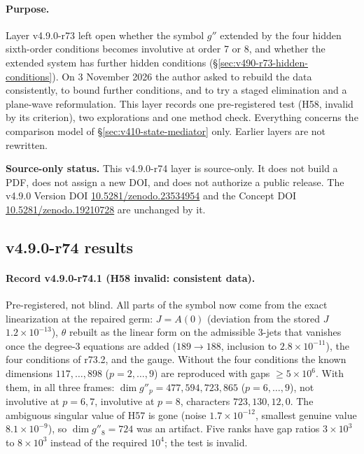 \paragraph{Purpose.}
Layer v4.9.0-r73 left open whether the symbol \(g''\) extended by the four hidden sixth-order conditions becomes involutive at
order 7 or 8, and whether the extended system has further hidden conditions (\S\ref{sec:v490-r73-hidden-conditions}).  On
3 November 2026 the author asked to rebuild the data consistently, to bound further conditions, and to try a staged
elimination and a plane-wave reformulation.  This layer records one pre-registered test (H58, invalid by its criterion), two
explorations and one method check.  Everything concerns the comparison model of \S\ref{sec:v410-state-mediator} only.
Earlier layers are not rewritten.

\noindent\textbf{Source-only status.}
This v4.9.0-r74 layer is source-only.  It does not build a PDF, does not assign a new DOI,
and does not authorize a public release.  The v4.9.0 Version DOI
\href{https://doi.org/10.5281/zenodo.23534954}{10.5281/zenodo.23534954} and the Concept DOI
\href{https://doi.org/10.5281/zenodo.19210728}{10.5281/zenodo.19210728} are unchanged by it.

\subsection*{v4.9.0-r74 results}
\label{subsec:v490-r74-results}

\paragraph{Record v4.9.0-r74.1 (H58 invalid: consistent data).}
Pre-registered, not blind.  All parts of the symbol now come from the exact linearization at the repaired germ: \(J=A(0)\)
(deviation from the stored \(J\) \(1.2\times10^{-13}\)), \(\theta\) rebuilt as the linear form on the admissible 3-jets that
vanishes once the degree-3 equations are added (\(189\to188\), inclusion to \(2.8\times10^{-11}\)), the four conditions of
r73.2, and the gauge.  Without the four conditions the known dimensions \(117,\dots,898\) (\(p=2,\dots,9\)) are reproduced
with gaps \(\ge5\times10^6\).  With them, in all three frames: \(\dim g''_p=477,594,723,865\) (\(p=6,\dots,9\)), not
involutive at \(p=6,7\), involutive at \(p=8\), characters \(723,130,12,0\).  The ambiguous singular value of H57 is gone
(noise \(1.7\times10^{-12}\), smallest genuine value \(8.1\times10^{-9}\)), so \(\dim g''_8=724\) was an artifact.  Five ranks
have gap ratios \(3\times10^3\) to \(8\times10^3\) instead of the required \(10^4\); the test is invalid.

